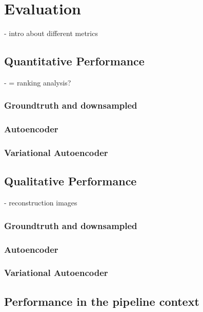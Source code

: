 
\chapter{Evaluation}\label{chapter:evaluation}
- intro about different metrics

\section{Quantitative Performance}
- = ranking analysis?
\subsection{Groundtruth and downsampled}
\subsection{Autoencoder}
\subsection{Variational Autoencoder}

\section{Qualitative Performance}
- reconstruction images
\subsection{Groundtruth and downsampled}
\subsection{Autoencoder}
\subsection{Variational Autoencoder}

\section{Performance in the pipeline context}
